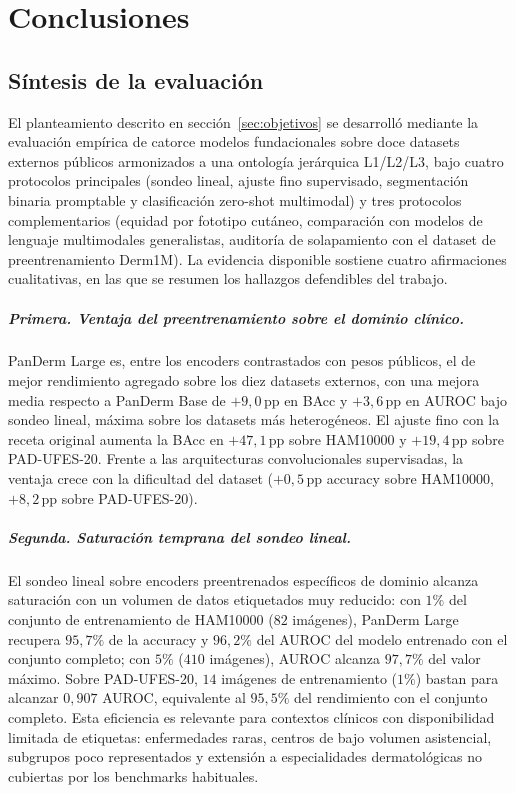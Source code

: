 
\chapter{Conclusiones}
\label{cap:conclusiones}

\section{Síntesis de la evaluación}
\label{sec:respuesta}

El planteamiento descrito en sección~\ref{sec:objetivos} se desarrolló mediante
la evaluación empírica de catorce modelos fundacionales sobre doce
datasets externos públicos armonizados a una ontología jerárquica
L1/L2/L3, bajo cuatro protocolos principales (sondeo lineal,
ajuste fino supervisado, segmentación binaria promptable y
clasificación zero-shot multimodal) y tres protocolos
complementarios (equidad por fototipo cutáneo, comparación con
modelos de lenguaje multimodales generalistas, auditoría de
solapamiento con el dataset de preentrenamiento Derm1M). La
evidencia disponible sostiene cuatro afirmaciones cualitativas, en
las que se resumen los hallazgos defendibles del trabajo.

\paragraph{Primera. Ventaja del preentrenamiento sobre el dominio
clínico.}
PanDerm Large es, entre los encoders contrastados con pesos públicos, el
de mejor rendimiento agregado sobre los diez datasets externos, con una
mejora media respecto a PanDerm Base de $+9{,}0$\,pp en BAcc y
$+3{,}6$\,pp en AUROC bajo sondeo lineal, máxima sobre los datasets más
heterogéneos. El ajuste fino con la receta original aumenta la BAcc en
$+47{,}1$\,pp sobre HAM10000 y $+19{,}4$\,pp sobre PAD-UFES-20. Frente a
las arquitecturas convolucionales supervisadas, la ventaja crece con la
dificultad del dataset ($+0{,}5$\,pp accuracy sobre HAM10000,
$+8{,}2$\,pp sobre PAD-UFES-20).

\paragraph{Segunda. Saturación temprana del sondeo lineal.}
El sondeo lineal sobre encoders preentrenados específicos de
dominio alcanza saturación con un volumen de datos etiquetados muy
reducido: con $1\%$ del conjunto de entrenamiento de HAM10000
($82$ imágenes), PanDerm Large recupera $95{,}7\%$ de la
accuracy y $96{,}2\%$ del AUROC del modelo entrenado con el
conjunto completo; con $5\%$ ($410$ imágenes), AUROC alcanza
$97{,}7\%$ del valor máximo. Sobre PAD-UFES-20, $14$ imágenes
de entrenamiento ($1\%$) bastan para alcanzar $0{,}907$
AUROC, equivalente al $95{,}5\%$ del rendimiento con el conjunto
completo. Esta eficiencia es relevante para contextos clínicos con
disponibilidad limitada de etiquetas: enfermedades raras, centros
de bajo volumen asistencial, subgrupos poco representados y
extensión a especialidades dermatológicas no cubiertas por los
benchmarks habituales.

